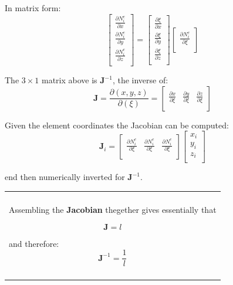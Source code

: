 \documentclass[10pt,b5paper,titlepage]{book}
\newcommand{\m}{\mathbf}
\newenvironment{bbox}[1][0.96]
{
    \begin{center}
        \begin{tabular}{|p{#1\textwidth}|}
            \hline\\
}
{
            \\\\\hline
        \end{tabular}
    \end{center}
}
\begin{document}
In matrix form:
\begin{equation}
    \begin{bmatrix}
        \frac{\partial N_i^e}{\partial x} \\
        \frac{\partial N_i^e}{\partial y} \\
        \frac{\partial N_i^e}{\partial z} \\
    \end{bmatrix}
    = \begin{bmatrix}
        \frac{\partial \xi}{\partial x} \\
        \frac{\partial \xi}{\partial y} \\
        \frac{\partial \xi}{\partial z} \\
    \end{bmatrix}
    \begin{bmatrix}
        \frac{\partial N_i^e}{\partial \xi} \\
    \end{bmatrix}
\end{equation}

The $ 3 \times 1 $ matrix above is $ \m{J}^{-1} $, the inverse of:
\begin{equation}
    \m{J} = \frac{\partial (x, y, z)}{\partial(\xi)} =
    \begin{bmatrix}
        \frac{\partial x}{\partial \xi} &
        \frac{\partial y}{\partial \xi} &
        \frac{\partial z}{\partial \xi} \\
    \end{bmatrix}
\end{equation}

Given the element coordinates the Jacobian can be computed:
\begin{equation}
    \m{J}_i = \begin{bmatrix}
        \frac{\partial N_i^e}{\partial \xi} &
        \frac{\partial N_i^e}{\partial \xi} &
        \frac{\partial N_i^e}{\partial \xi} \\
    \end{bmatrix}
    \begin{bmatrix}
        x_i \\
        y_i \\
        z_i \\
    \end{bmatrix}
\end{equation}

end then numerically inverted for $ \m{J}^{-1} $.

\begin{bbox}
    Assembling the \textbf{Jacobian} thegether gives essentially that

    \begin{equation}
        \m{J} = l
    \end{equation}

    and therefore:
    \begin{equation}
        \m{J}^{-1} = \frac{1}{l}
    \end{equation}
\end{bbox}
\end{document}
